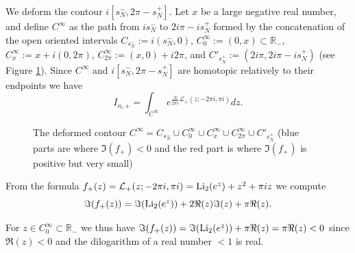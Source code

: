 \documentclass[11pt]{amsart}
\newcommand{\mr}{\mathbb{R}}
\newcommand{\R}{\mathbb{R}}
\begin{document}
{We deform the contour $i[s_N^-,2\pi-s_N^+]$. Let $x$ be a large negative real number, and define $C^\infty$ as the path from $is_N^-$ to $2i\pi -is_N^+$ formed by the concatenation of the open oriented intervals $C_{s_N^-}:=i(s_N^-,0)$, $C^\infty_0:=(0,x)\subset \mr_-$, $C^\infty_x:=x+ i(0,2\pi)$, $C^\infty_{2\pi}:=(x,0)+i2\pi$, and $C'_{s_N^+}:=(2i\pi,2i\pi-is_N^+)$ (see Figure \ref{fig:contour:a:+}). Since $C^\infty$ and $i[s_N^-,2\pi-s_N^+]$ are homotopic relatively to their endpoints we have 
\begin{equation}\label{defneg}
	I_{n,+} = \int_{C^\infty} e^{\frac{N}{2\pi i}\mathcal{L}_+(z;-2\pi i,\pi i)}dz.
\end{equation}
\begin{figure}[!h]
\caption{The deformed contour $C^\infty=C_{s_N^-} \cup C^\infty_0 \cup C^\infty_x \cup C^\infty_{2\pi} \cup C'_{s_N^+}$ (blue parts are where $\Im(f_+)<0$ and the red part is where $\Im(f_+)$ is positive but very small)
	}\label{fig:contour:a:+}
\end{figure}


From the formula $f_+(z)=\mathcal{L}_+(z;-2\pi i,\pi i) = {\rm Li}_2(e^{z})+z^2+\pi iz$ we compute
$$\Im(f_+(z))= \Im({\rm Li}_2(e^{z}))+2 \Re(z)\Im(z) + \pi \Re(z).$$

For $z \in C_0^\infty \subset \R_-$ we thus have $\Im(f_+(z))= \Im({\rm Li}_2(e^{z}))+ \pi \Re(z)= \pi \Re(z)<0$ since $\Re(z)<0$ and the dilogarithm of a real number $<1$ is real.

}
\end{document}
